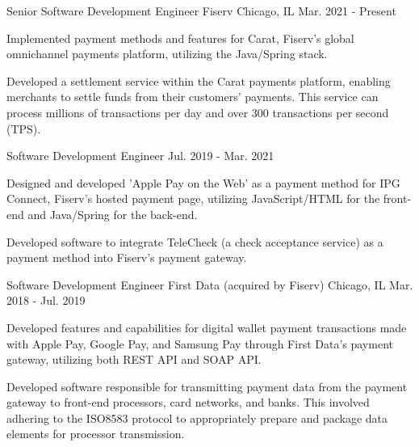 
\begin{cventries}

    \cventry
    {Senior Software Development Engineer} %
    {Fiserv} %
    {Chicago, IL} %
    {Mar. 2021 - Present} %
    {
        \begin{cvitems} %
            \item {Implemented payment methods and features for Carat, Fiserv’s global omnichannel payments platform, utilizing the Java/Spring stack.}
            \item {Developed a settlement service within the Carat payments platform, enabling merchants to settle funds from their customers' payments. This service can process millions of transactions per day and over 300 transactions per second (TPS).}
        \end{cvitems}
    }
    \cventry
    {Software Development Engineer} %
    {} %
    {} %
    {Jul. 2019 - Mar. 2021} %
    {
        \begin{cvitems} %
            \item {Designed and developed 'Apple Pay on the Web' as a payment method for IPG Connect, Fiserv's hosted payment page, utilizing JavaScript/HTML for the front-end and Java/Spring for the back-end.}
            \item {Developed software to integrate TeleCheck (a check acceptance service) as a payment method into Fiserv's payment gateway.}
        \end{cvitems}
    }


    \cventry
    {Software Development Engineer} %
    {First Data (acquired by Fiserv)} %
    {Chicago, IL} %
    {Mar. 2018 - Jul. 2019} %
    {
        \begin{cvitems} %
            \item {Developed features and capabilities for digital wallet payment transactions made with Apple Pay, Google Pay, and Samsung Pay through First Data's payment gateway, utilizing both REST API and SOAP API.}
            \item {Developed software responsible for transmitting payment data from the payment gateway to front-end processors, card networks, and banks. This involved adhering to the ISO8583 protocol to appropriately prepare and package data elements for processor transmission.}
        \end{cvitems}
    }


\end{cventries}
